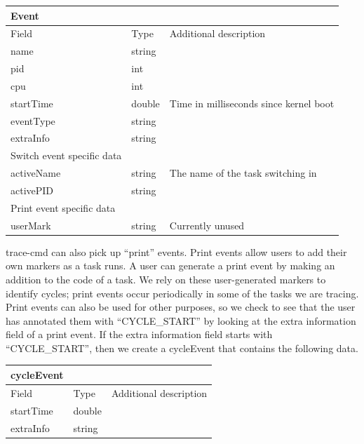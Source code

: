 \documentclass{hmcclinic}
\begin{document}
  \begin{center}
    \begin{tabular}{lll}
      Event      &        &                                        \\
      \hline
      Field     & Type   & Additional description                 \\
      \hline
      name      & string &                                        \\
      pid       & int    &                                        \\
      cpu       & int    &                                        \\
      startTime & double & Time in milliseconds since kernel boot \\
      eventType & string &                                        \\
      extraInfo & string &                                        \\
      \hline
      Switch event specific data & & \\
      \hline
      activeName & string & The name of the task switching in      \\
      activePID  & string &                                        \\
      \hline
      Print event specific data & & \\
      \hline
      userMark   & string & Currently unused
    \end{tabular}
  \end{center}

  trace-cmd can also pick up ``print'' events. Print events allow users to add
  their own markers as a task runs. A user can generate a print event by making
  an addition to the code of a task. We rely on these user-generated markers to
  identify cycles; print events occur periodically in some of the tasks we are
  tracing. Print events can also be used for other purposes, so we check to see
  that the user has annotated them with ``CYCLE\_START'' by looking at the extra
  information field of a print event. If the extra information field starts with
  ``CYCLE\_START'', then we create a cycleEvent that contains the following data.

  \begin{center}
    \begin{tabular}{lll}
      cycleEvent      &        &                                        \\
      \hline
      Field     & Type   & Additional description                 \\
      \hline
      startTime      & double &                                        \\
      extraInfo       & string    &                                        \\
    \end{tabular}
  \end{center}
\end{document}
